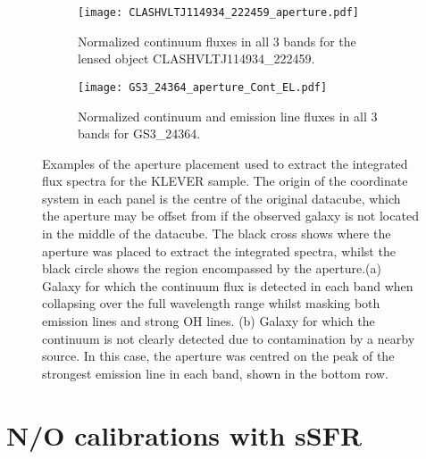 \documentclass[usenatbib]{mnras} %
\begin{document}
\begin{figure*}

    \begin{subfigure}{\textwidth}
      \centering
      \texttt{[image: CLASHVLTJ114934\_222459\_aperture.pdf]}
      \centering
      \vspace*{-4.2mm}
      \caption{Normalized continuum fluxes in all 3 bands for the lensed object CLASHVLTJ114934\_222459.}
      \label{fig:sub-macs-app}
    \end{subfigure}
    
    \begin{subfigure}{\textwidth}
      \centering
      \texttt{[image: GS3\_24364\_aperture\_Cont\_EL.pdf]}
      \centering
      \caption{Normalized continuum and emission line fluxes in all 3 bands for GS3\_24364.}
      \label{fig:sub-goods-app}
    \end{subfigure}

    \caption{Examples of the aperture placement used to extract the integrated flux spectra for the KLEVER sample. The origin of the coordinate system in each panel is the centre of the original datacube, which the aperture may be offset from if the observed galaxy is not located in the middle of the datacube. The black cross shows where the aperture was placed to extract the integrated spectra, whilst the black circle shows the region encompassed by the aperture.(a) Galaxy for which the continuum flux is detected in each band when collapsing over the full wavelength range whilst masking both emission lines and strong OH lines. (b) Galaxy for which the continuum is not clearly detected due to contamination by a nearby source. In this case, the aperture was centred on the peak of the strongest emission line in each band, shown in the bottom row. 
    }
    \label{aperture}
\end{figure*}

\section{N/O calibrations with sSFR}
\label{sec:sSFR_appendix}
\end{document}
